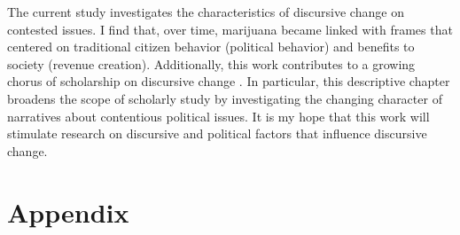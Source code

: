 
The current study investigates the characteristics of discursive change on contested issues. I find that, over time, marijuana became linked with frames that centered on traditional citizen behavior (political behavior) and benefits to society (revenue creation). Additionally, this work contributes to a growing chorus of scholarship on discursive change \citep{bail_2012,bateman_et_al_2019}. In particular, this descriptive chapter broadens the scope of scholarly study by investigating the changing character of narratives about contentious political issues. It is my hope that this work will stimulate research on discursive and political factors that influence discursive change.




%
%
\newpage



\section{Appendix}

%



%


